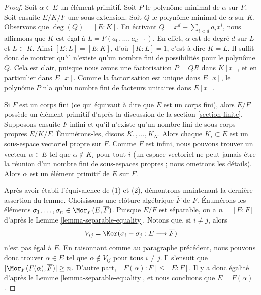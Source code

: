 \begin{proof}
Soit $\alpha \in E$ un élément primitif. Soit $P$ le polynôme minimal
de $\alpha$ sur $F$. Soit ensuite $E/K/F$ une sous-extension.
Soit $Q$ le polynôme minimal de $\alpha$ sur $K$. Observons que
$\deg(Q) = [E : K]$. En écrivant $Q = x^d + \sum_{i < d} a_i x^i$, nous affirmons que
$K$ est égal à $L = F(a_0, \ldots, a_{d - 1})$. En effet, $\alpha$ est de degré
$d$ sur $L$ et $L \subset K$. Ainsi $[E : L] = [E : K]$, d'où
$[K : L] = 1$, c'est-à-dire $K = L$.
Il suffit donc de montrer qu'il n'existe qu'un nombre fini de possibilités
pour le polynôme $Q$. Cela est clair, puisque nous avons une factorisation
$P = QR$  dans $K[x]$, et en particulier dans $E[x]$. Comme la factorisation
est unique dans $E[x]$, le polynôme $P$ n'a qu'un nombre fini de facteurs
unitaires dans $E[x]$.

\medskip\noindent
Si $F$ est un corps fini (ce qui équivaut à dire que $E$ est un corps fini), alors
$E/F$ possède un élément primitif d'après la discussion de la
section \ref{section-finite}.
Supposons ensuite $F$ infini et qu'il n'existe qu'un nombre fini de sous-corps
propres $E/K/F$. Énumérons-les, disons $K_1, \ldots, K_N$. Alors
chaque $K_i \subset E$ est un sous-espace vectoriel propre sur $F$. Comme $F$ est infini,
nous pouvons trouver un vecteur $\alpha \in E$ tel que $\alpha \not \in K_i$ pour tout $i$
(un espace vectoriel ne peut jamais être la réunion d'un nombre fini de sous-espaces propres ;
nous omettons les détails). Alors $\alpha$ est un élément primitif de $E$ sur $F$.

\medskip\noindent
Après avoir établi l'équivalence de (1) et (2), démontrons maintenant
la dernière assertion du lemme. Choisissons une clôture algébrique
$\overline{F}$ de $F$. Énumérons les éléments
$\sigma_1, \ldots, \sigma_n \in \Mor_F(E, \overline{F})$.
Puisque $E/F$ est séparable, on a $n = [E : F]$ d'après le
Lemme \ref{lemma-separable-equality}.
Notons que, si $i \not = j$, alors
$$
V_{ij} = \Ker(\sigma_i - \sigma_j : E \longrightarrow \overline{F})
$$
n'est pas égal à $E$. En raisonnant comme au paragraphe précédent,
nous pouvons donc trouver $\alpha \in E$ tel que $\alpha \not \in V_{ij}$ pour tous
$i \not = j$. Il s'ensuit que $|\Mor_F(F(\alpha), \overline{F})| \geq n$.
D'autre part, $[F(\alpha) : F] \leq [E : F]$. Il y a donc égalité
d'après le Lemme \ref{lemma-separable-equality},
et nous concluons que $E = F(\alpha)$.
\end{proof}






